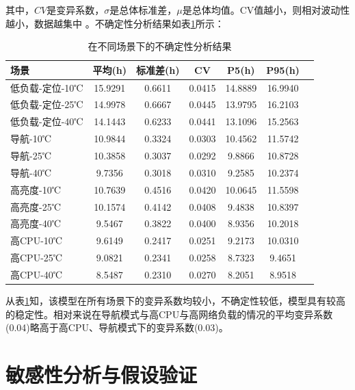 \documentclass{mcmthesis}  %
\begin{document}
	其中，\(CV\)是变异系数，\(\sigma\)是总体标准差，\(\mu\)是总体均值。CV值越小，则相对波动性越小，数据越集中 。不确定性分析结果如表\ref{tab:控制变量}所示：
	\begin{table}[h!]
		\centering
		\renewcommand{\arraystretch}{1.5}
		\caption{在不同场景下的不确定性分析结果}
		\label{tab:控制变量}
		\begin{tabular}{lcccccc}
			\toprule
			场景 & 平均(h) & 标准差(h) & CV & P5(h) & P95(h) \\
			\midrule
			\rowcolor{pink}
			低负载-定位-10℃ & 15.9291 & 0.6611 & 0.0415 & 14.8889 & 16.9940 \\
			低负载-定位-25℃ & 14.9978 & 0.6667 & 0.0445 & 13.9795 & 16.2103 \\
			\rowcolor{pink}
			低负载-定位-40℃ & 14.1443 & 0.6233 & 0.0441 & 13.1096 & 15.2563 \\
			导航-10℃ & 10.9844 & 0.3324 & 0.0303 & 10.4562 & 11.5742 \\
			\rowcolor{pink}
			导航-25℃ & 10.3858 & 0.3037 & 0.0292 & 9.8866 & 10.8728 \\
			导航-40℃ & 9.7356 & 0.3018 & 0.0310 & 9.2585 & 10.2374 \\
			\rowcolor{pink}
			高亮度-10℃ & 10.7639 & 0.4516 & 0.0420 & 10.0645 & 11.5598 \\
			高亮度-25℃ & 10.1574 & 0.4142 & 0.0408 & 9.4838 & 10.8397 \\
			\rowcolor{pink}
			高亮度-40℃ & 9.5467 & 0.3822 & 0.0400 & 8.9356 & 10.2018 \\
			高CPU-10℃ & 9.6149 & 0.2417 & 0.0251 & 9.2173 & 10.0310 \\
			\rowcolor{pink}
			高CPU-25℃ & 9.0821 & 0.2341 & 0.0258 & 8.7323 & 9.4651 \\
			高CPU-40℃ & 8.5487 & 0.2310 & 0.0270 & 8.2051 & 8.9518 \\
			\bottomrule
		\end{tabular}
	\end{table}
	
	\newpage
	
	从表\ref{tab:控制变量}知，该模型在所有场景下的变异系数均较小，不确定性较低，模型具有较高的稳定性。相对来说在导航模式与高CPU与高网络负载的情况的平均变异系数(0.04)略高于高CPU、导航模式下的变异系数(0.03)。
	
	
	
	\section{敏感性分析与假设验证}  %
	
\end{document}
